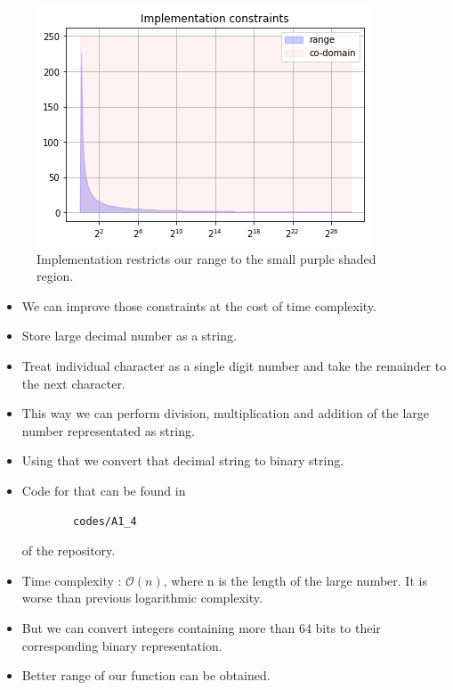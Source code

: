 \documentclass[journal,12pt,twocolumn]{IEEEtran}
\begin{document}
\begin{figure}[]
    \centering
    \includegraphics[scale=0.5]{images/constraints.png}
    \caption{Implementation restricts our range to the small purple shaded region.}
    \label{fig:constraints}
\end{figure}

\begin{itemize}
    \item We can improve those constraints at the cost of time complexity.
    \item Store large decimal number as a string.
    \item Treat individual character as a single digit number and take the remainder to the next character.
    \item This way we can perform division, multiplication and addition of the large number representated as string.
    \item Using that we convert that decimal string to binary string.
    \item Code for that can be found in \begin{lstlisting}
        codes/A1_4
    \end{lstlisting} of the repository.
    \item Time complexity : $\mathcal{O}(n)$, where n is the length of the large number. It is worse than previous logarithmic complexity.
    \item But we can convert integers containing more than 64 bits to their corresponding binary representation.
    \item Better range of our function can be obtained.
\end{itemize}
\end{document}

